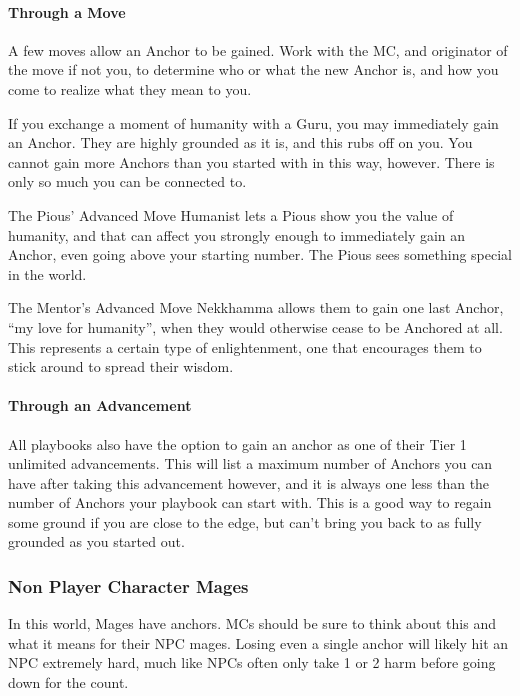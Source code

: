 \documentclass[
]{article}
\begin{document}
\hypertarget{through-a-move}{%
\paragraph{Through a Move}\label{through-a-move}}

A few moves allow an Anchor to be gained. Work with the MC, and
originator of the move if not you, to determine who or what the new
Anchor is, and how you come to realize what they mean to you.

If you exchange a moment of humanity with a Guru, you may immediately
gain an Anchor. They are highly grounded as it is, and this rubs off on
you. You cannot gain more Anchors than you started with in this way,
however. There is only so much you can be connected to.

The Pious' Advanced Move Humanist lets a Pious show you the value of
humanity, and that can affect you strongly enough to immediately gain an
Anchor, even going above your starting number. The Pious sees something
special in the world.

The Mentor's Advanced Move Nekkhamma allows them to gain one last
Anchor, ``my love for humanity'', when they would otherwise cease to be
Anchored at all. This represents a certain type of enlightenment, one
that encourages them to stick around to spread their wisdom.

\hypertarget{through-an-advancement}{%
\paragraph{Through an Advancement}\label{through-an-advancement}}

All playbooks also have the option to gain an anchor as one of their
Tier 1 unlimited advancements. This will list a maximum number of
Anchors you can have after taking this advancement however, and it is
always one less than the number of Anchors your playbook can start with.
This is a good way to regain some ground if you are close to the edge,
but can't bring you back to as fully grounded as you started out.

\hypertarget{non-player-character-mages}{%
\subsubsection{Non Player Character
Mages}\label{non-player-character-mages}}

In this world, Mages have anchors. MCs should be sure to think about
this and what it means for their NPC mages. Losing even a single anchor
will likely hit an NPC extremely hard, much like NPCs often only take 1
or 2 harm before going down for the count.
\end{document}
